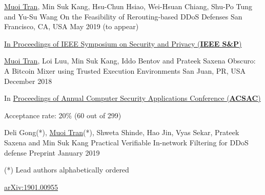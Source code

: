 


\begin{cventries}

  \cventry
    {\underline{Muoi Tran}, Min Suk Kang, Hsu-Chun Hsiao, Wei-Hsuan Chiang, Shu-Po Tung and Yu-Su Wang} %
    {On the Feasibility of Rerouting-based DDoS Defenses } %
    {San Francisco, CA, USA} %
    {May 2019 (to appear)} %
    {
      \begin{cvitems} %
        \item {\href{https://www.ieee-security.org/TC/SP2019/}{In Proceedings of IEEE Symposium on Security and Privacy (\textbf{IEEE S\&P})}}
      \end{cvitems}
    }

  \cventry
    {\underline{Muoi Tran}, Loi Luu, Min Suk Kang, Iddo Bentov and Prateek Saxena } %
    {Obscuro: A Bitcoin Mixer using Trusted Execution Environments} %
    {San Juan, PR, USA}
    {December 2018} %
    {
      \begin{cvitems} %
        \item {In \href{https://www.acsac.org/2018/}{Proceedings of Annual Computer Security Applications Conference (\textbf{ACSAC})}}
        \item {Acceptance rate: 20\% (60 out of 299)}
      \end{cvitems}
    }

  \cventry
    {Deli Gong(*), \underline{Muoi Tran}(*), Shweta Shinde, Hao Jin, Vyas Sekar, Prateek Saxena and Min Suk Kang} %
    {Practical Verifiable In-network Filtering for DDoS defense} %
    {Preprint}
    {January 2019}
    {
      \begin{cvitems} %
        \item {(*) Lead authors alphabetically ordered}
        \item {\href{https://arxiv.org/abs/1901.00955}{arXiv:1901.00955}}
      \end{cvitems}
    }

\end{cventries}




